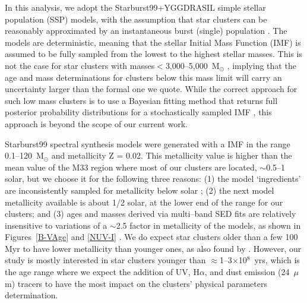 \documentclass{aastex63}
\begin{document}
In this analysis, we adopt the Starburst99+YGGDRASIL simple stellar population (SSP) models, with the assumption that star clusters can be reasonably approximated by an instantaneous burst (single) population \citep{Wofford+2016}. The models are deterministic, meaning that the stellar Initial Mass Function (IMF) is assumed to be fully sampled from the lowest to the highest stellar masses. This is not the case for star clusters with masses$<$3,000--5,000~M$_{\odot}$ \citep[e.g.,][]{Cervino+2002}, implying that the age and mass determinations for clusters below this mass limit will carry an uncertainty larger than the formal one we quote. While the correct approach for such low mass clusters is to use a Bayesian fitting method that returns full posterior probability distributions for a stochastically  sampled IMF \citep[e.g., SLUG][]{Krumholz+2019b}, this approach is beyond the scope of our current work.

Starburst99 \citep{Leitherer+1999} spectral synthesis models were generated with a \citet{Kroupa2001} IMF in the range 0.1–120~M$_{\odot}$ and metallicity Z = 0.02. This  metallicity value is higher than the mean value of  the M33 region where most of our clusters are located, $\sim$0.5--1 solar, but we choose it for the following three reasons: (1) the model `ingredients' are inconsistently sampled for metallicity below solar \citep{Vazquez+2005}; (2) the next model metallicity available is about 1/2 solar, at the lower end of the range for our clusters; and (3) ages and masses derived via multi--band SED fits are relatively insensitive to variations of a $\sim$2.5 factor in metallicity of the models, as shown in Figures~\ref{B-VAge} and \ref{NUV-I}  \citep[see, also,][and SM2007]{deGrijs2005}. We do expect star clusters older than a few 100 Myr to have lower metallicity than younger ones, as also found by \citet{Ma+2001}. However, our study is mostly interested in star clusters younger than $\approx$1--3$\times$10$^8$~yrs, which is the age range where we expect the  addition of UV, H$\alpha$, and dust emission (24~$\mu$m) tracers to  have the most impact on the clusters' physical parameters determination. 
\end{document}
